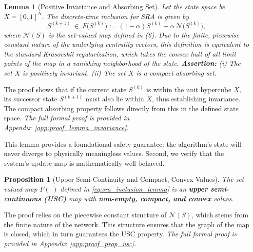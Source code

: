 \documentclass[journal]{IEEEtran}
\newtheorem{proposition}{Proposition}
\newtheorem{lemma}{Lemma}
\begin{document}
\begin{lemma}[Positive Invariance and Absorbing Set]
\label{lemma:invariance}
Let the state space be $X=[0,1]^N$. The discrete-time inclusion for SRA is given by
\begin{equation}\label{eq:sra_inclusion_lemma}
S^{(k+1)}\ \in\ F\big(S^{(k)}\big):=(1-\alpha)S^{(k)}+\alpha\,\mathcal N\!\big(S^{(k)}\big),
\end{equation}
where $\mathcal{N}(S)$ is the set-valued map defined in (6). Due to the finite, piecewise constant nature of the underlying centrality vectors, this definition is equivalent to the standard Krasovskii regularization, which takes the convex hull of all limit points of the map in a vanishing neighborhood of the state.
\textbf{Assertion:} (i) The set $X$ is positively invariant. (ii) The set $X$ is a compact absorbing set.
\end{lemma}
\begin{IEEEproof}
The proof shows that if the current state $S^{(k)}$ is within the unit hypercube $X$, its successor state $S^{(k+1)}$ must also lie within $X$, thus establishing invariance. The compact absorbing property follows directly from this in the defined state space.
\textit{The full formal proof is provided in Appendix~\ref{app:proof_lemma_invariance}.}
\end{IEEEproof}

This lemma provides a foundational safety guarantee: the algorithm's state will never diverge to physically meaningless values. Second, we verify that the system's update map is mathematically well-behaved.

\begin{proposition}[Upper Semi-Continuity and Compact, Convex Values]
\label{prop:usc}
The set-valued map $F(\cdot)$ defined in \eqref{eq:sra_inclusion_lemma} is an \textbf{upper semi-continuous (USC)} map with \textbf{non-empty, compact, and convex} values.
\end{proposition}
\begin{IEEEproof}
The proof relies on the piecewise constant structure of $\mathcal N(S)$, which stems from the finite nature of the network. This structure ensures that the graph of the map is closed, which in turn guarantees the USC property.
\textit{The full formal proof is provided in Appendix~\ref{app:proof_prop_usc}.}
\end{IEEEproof}
\end{document}
